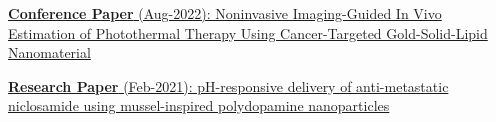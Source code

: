 \documentclass[letterpaper]{deedy-resume} %
\begin{document}
\begin{minipage}[t]{0.62\textwidth}
\begin{tightitemize}
    \vspace{\topsep}
    \item {\href{https://www.thieme-connect.com/products/ejournals/abstract/10.1055/s-0042-1755497}{
        {\bf Conference Paper} 
        (Aug-2022):  Noninvasive Imaging-Guided In Vivo Estimation of Photothermal Therapy Using Cancer-Targeted Gold-Solid-Lipid Nanomaterial}}
    \vspace{\topsep}
    \item {\href{https://pubmed.ncbi.nlm.nih.gov/33540007/}{
        {\bf Research Paper} 
        (Feb-2021):  pH-responsive delivery of anti-metastatic niclosamide using mussel-inspired polydopamine nanoparticles}}
\end{tightitemize}

\sectionspace %


\end{minipage} %








\end{document}
